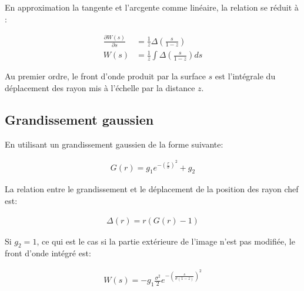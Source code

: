\documentclass[a4paper,10pt]{article}
\numberwithin{equation}{section}
\numberwithin{figure}{section}
\numberwithin{table}{section}
\begin{document}
En approximation la tangente et l'arcgente comme linéaire, la relation se réduit à :

\begin{align}
	\frac{\partial W(s)}{\partial s} &= \frac{1}{z} \Delta\left(\frac{s}{1-z}\right) \\
	W(s) &= \frac{1}{z} \int \Delta\left(\frac{s}{1-z}\right) ds
\end{align}

Au premier ordre, le front d'onde produit par la surface $s$ est l'intégrale du déplacement des rayon mis à l'échelle par la distance $z$.

\subsection{Grandissement gaussien}

En utilisant un grandissement gaussien de la forme suivante:

\begin{align}
	G(r) = g_1e^{-(\frac{r}{\sigma})^2} + g_2
\end{align}

La relation entre le grandissement et le déplacement de la position des rayon chef est:

\begin{align}
	\Delta(r) = r(G(r)-1)
\end{align}

Si $g_2 = 1$, ce qui est le cas si la partie extérieure de l'image n'est pas modifiée, le front d'onde intégré est:

\begin{align}
	W(s) = -g_1\frac{\sigma^2}{2}e^{-\left(\frac{s}{\sigma(1-z)}\right)^2}
\end{align}
\end{document}

